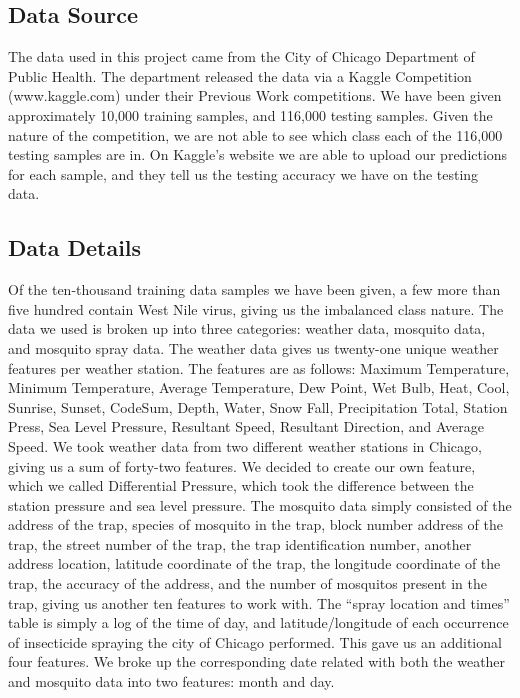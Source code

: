 \documentclass{article} %
\begin{document}
\subsection{Data Source}
The data used in this project came from the City of Chicago Department of Public Health.  The department released the data via a Kaggle Competition (www.kaggle.com) under their Previous Work competitions.  We have been given approximately 10,000 training samples, and 116,000 testing samples.  Given the nature of the competition, we are not able to see which class each of the 116,000 testing samples are in.  On Kaggle’s website we are able to upload our predictions for each sample, and they tell us the testing accuracy we have on the testing data.

\subsection{Data Details}
Of the ten-thousand training data samples we have been given, a few more than five hundred contain West Nile virus, giving us the imbalanced class nature. The data we used is broken up into three  categories: weather data, mosquito data, and mosquito spray data.  The weather data gives us twenty-one unique weather features per weather station.  The features are as follows:  Maximum Temperature, Minimum Temperature, Average Temperature, Dew Point, Wet Bulb, Heat, Cool, Sunrise, Sunset, CodeSum, Depth, Water, Snow Fall, Precipitation Total, Station Press, Sea Level Pressure, Resultant Speed, Resultant Direction, and Average Speed. We took weather data from two different weather stations in Chicago, giving us a sum of forty-two features.  We decided to create our own feature, which we called Differential Pressure, which took the difference between the station pressure and sea level pressure.  The mosquito data simply consisted of the address of the trap,  species of mosquito in the trap, block number address of the trap, the street number of the trap, the trap identification number, another address location, latitude coordinate of the trap, the longitude coordinate of the trap, the accuracy of the address, and the number of mosquitos present in the trap, giving us another ten features to work with.  The “spray location and times” table is simply a log of the time of day, and latitude/longitude of each occurrence of insecticide spraying the city of Chicago performed. This gave us an additional four features. We broke up the corresponding date related with both the weather and mosquito data into two features: month and day.  
\end{document}
